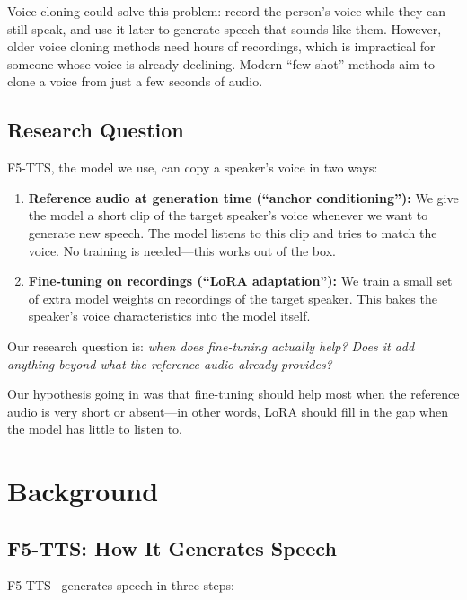 \documentclass[11pt, a4paper]{article}
\begin{document}
Voice cloning could solve this problem: record the person's voice while they can still speak, and use it later to generate speech that sounds like them. However, older voice cloning methods need hours of recordings, which is impractical for someone whose voice is already declining. Modern ``few-shot'' methods aim to clone a voice from just a few seconds of audio.

\subsection{Research Question}

F5-TTS, the model we use, can copy a speaker's voice in two ways:

\begin{enumerate}[itemsep=4pt]
    \item \textbf{Reference audio at generation time (``anchor conditioning''):} We give the model a short clip of the target speaker's voice whenever we want to generate new speech. The model listens to this clip and tries to match the voice. No training is needed---this works out of the box.

    \item \textbf{Fine-tuning on recordings (``LoRA adaptation''):} We train a small set of extra model weights on recordings of the target speaker. This bakes the speaker's voice characteristics into the model itself.
\end{enumerate}

Our research question is: \emph{when does fine-tuning actually help? Does it add anything beyond what the reference audio already provides?}

Our hypothesis going in was that fine-tuning should help most when the reference audio is very short or absent---in other words, LoRA should fill in the gap when the model has little to listen to.

\section{Background}

\subsection{F5-TTS: How It Generates Speech}

F5-TTS~\citep{chen2024f5tts} generates speech in three steps:
\end{document}
